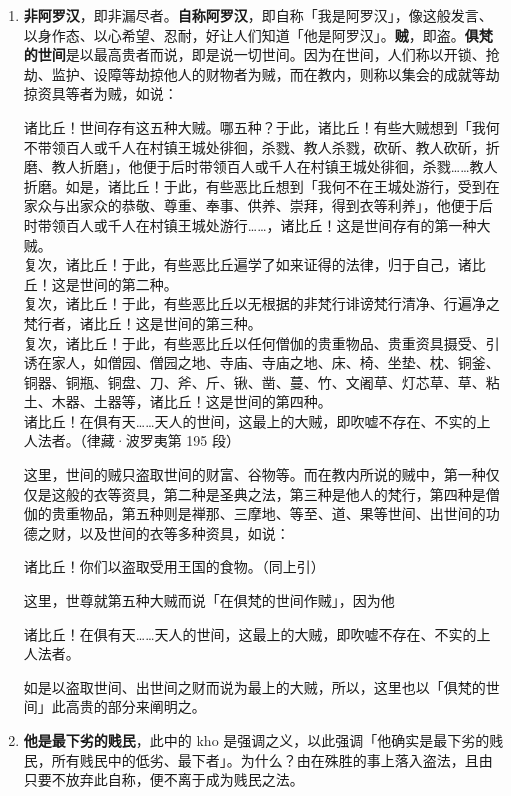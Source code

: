\begin{enumerate}\item \textbf{非阿罗汉}，即非漏尽者。\textbf{自称阿罗汉}，即自称「我是阿罗汉」，像这般发言、以身作态、以心希望、忍耐，好让人们知道「他是阿罗汉」。\textbf{贼}，即盗。\textbf{俱梵的世间}是以最高贵者而说，即是说一切世间。因为在世间，人们称以开锁、抢劫、监护、设障等劫掠他人的财物者为贼，而在教内，则称以集会的成就等劫掠资具等者为贼，如说：\begin{quoting}诸比丘！世间存有这五种大贼。哪五种？于此，诸比丘！有些大贼想到「我何不带领百人或千人在村镇王城处徘徊，杀戮、教人杀戮，砍斫、教人砍斫，折磨、教人折磨」，他便于后时带领百人或千人在村镇王城处徘徊，杀戮……教人折磨。如是，诸比丘！于此，有些恶比丘想到「我何不在王城处游行，受到在家众与出家众的恭敬、尊重、奉事、供养、崇拜，得到衣等利养」，他便于后时带领百人或千人在村镇王城处游行……，诸比丘！这是世间存有的第一种大贼。\\复次，诸比丘！于此，有些恶比丘遍学了如来证得的法律，归于自己，诸比丘！这是世间的第二种。\\复次，诸比丘！于此，有些恶比丘以无根据的非梵行诽谤梵行清净、行遍净之梵行者，诸比丘！这是世间的第三种。\\复次，诸比丘！于此，有些恶比丘以任何僧伽的贵重物品、贵重资具摄受、引诱在家人，如僧园、僧园之地、寺庙、寺庙之地、床、椅、坐垫、枕、铜釜、铜器、铜瓶、铜盘、刀、斧、斤、锹、凿、蔓、竹、文阇草、灯芯草、草、粘土、木器、土器等，诸比丘！这是世间的第四种。\\诸比丘！在俱有天……天人的世间，这最上的大贼，即吹嘘不存在、不实的上人法者。（律藏·波罗夷第 195 段）\end{quoting}这里，世间的贼只盗取世间的财富、谷物等。而在教内所说的贼中，第一种仅仅是这般的衣等资具，第二种是圣典之法，第三种是他人的梵行，第四种是僧伽的贵重物品，第五种则是禅那、三摩地、等至、道、果等世间、出世间的功德之财，以及世间的衣等多种资具，如说：\begin{quoting}诸比丘！你们以盗取受用王国的食物。（同上引）\end{quoting}这里，世尊就第五种大贼而说「在俱梵的世间作贼」，因为他\begin{quoting}诸比丘！在俱有天……天人的世间，这最上的大贼，即吹嘘不存在、不实的上人法者。\end{quoting}如是以盗取世间、出世间之财而说为最上的大贼，所以，这里也以「俱梵的世间」此高贵的部分来阐明之。
\item \textbf{他是最下劣的贱民}，此中的 kho 是强调之义，以此强调「他确实是最下劣的贱民，所有贱民中的低劣、最下者」。为什么？由在殊胜的事上落入盗法，且由只要不放弃此自称，便不离于成为贱民之法。

\end{enumerate}
